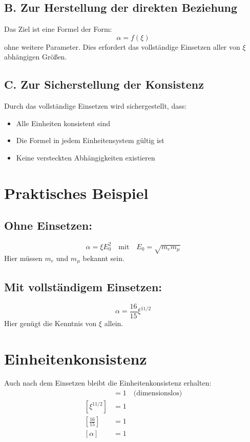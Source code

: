 \documentclass[12pt, a4paper]{article}
\begin{document}
\subsection*{B. Zur Herstellung der direkten Beziehung}
Das Ziel ist eine Formel der Form:
\[
\alpha = f(\xi)
\]
ohne weitere Parameter. Dies erfordert das vollständige Einsetzen aller von $\xi$ abhängigen Größen.

\subsection*{C. Zur Sicherstellung der Konsistenz}
Durch das vollständige Einsetzen wird sichergestellt, dass:
\begin{itemize}
	\item Alle Einheiten konsistent sind
	\item Die Formel in jedem Einheitensystem gültig ist
	\item Keine versteckten Abhängigkeiten existieren
\end{itemize}

\section*{Praktisches Beispiel}

\subsection*{Ohne Einsetzen:}
\[
\alpha = \xi E_0^2 \quad \text{mit} \quad E_0 = \sqrt{m_e m_\mu}
\]
Hier müssen $m_e$ und $m_\mu$ bekannt sein.

\subsection*{Mit vollständigem Einsetzen:}
\[
\alpha = \frac{16}{15} \xi^{11/2}
\]
Hier genügt die Kenntnis von $\xi$ allein.

\section*{Einheitenkonsistenz}

Auch nach dem Einsetzen bleibt die Einheitenkonsistenz erhalten:
\begin{align*}
	[\xi] &= 1 \quad \text{(dimensionslos)} \\
	[\xi^{11/2}] &= 1 \\
	\left[\frac{16}{15}\right] &= 1 \\
	[\alpha] &= 1
\end{align*}
\end{document}
